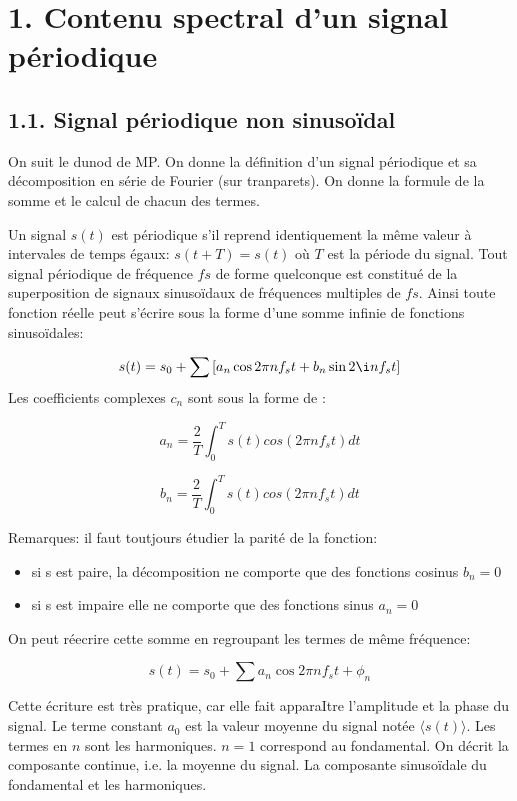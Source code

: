 \documentclass[french, a4paper, 10pt, twocolumn, landscape]{article}
\begin{document}
\section*{1. Contenu spectral d'un signal périodique}

\subsection*{1.1. Signal périodique non sinusoïdal}

On suit le dunod de MP. On donne la définition d'un signal périodique et sa décomposition en série de Fourier (sur tranparets). On donne la formule de la somme et le calcul de chacun des termes.\medskip

Un signal $s(t)$ est périodique s'il reprend identiquement la même valeur à intervales de temps égaux: $s(t+T)=s(t)$ où $T$ est la période du signal. Tout signal périodique de fréquence $fs$ de forme quelconque est constitué de la superposition de signaux sinusoïdaux de fréquences multiples de $fs$. Ainsi toute fonction réelle peut s'écrire sous la forme d'une somme infinie de fonctions sinusoïdales: 

\begin{equation}
  s(t)=s_0+\sum \left[a_n\cos{2\pi nf_st} + b_n\sin{2\i n f_st}\right]
\end{equation}
Les coefficients complexes $c_n$ sont sous la forme de :

$$  a_n = \dfrac{2}{T}\int_{0}^T{s(t)cos(2\pi nf_s t)dt}$$

$$  b_n = \dfrac{2}{T}\int_{0}^T{s(t)cos(2\pi nf_s t)dt}$$

Remarques: il faut toutjours étudier la parité de la fonction:
\begin{itemize}
  \item si s est paire, la décomposition ne comporte que des fonctions cosinus $b_n=0$
  \item si s est impaire elle ne comporte que des fonctions sinus $a_n =0$
\end{itemize}
On peut réecrire cette somme en regroupant les termes de même fréquence: 

\begin{equation}
  s(t)=s_0+\sum a_n\cos{2\pi nf_st+\phi_n}
\end{equation}

Cette écriture est très pratique, car elle fait apparaItre l'amplitude et la phase du signal. Le terme constant $a_0$ est la valeur moyenne du signal notée $\langle s(t) \rangle$. Les termes en $n$ sont les harmoniques. $n=1$ correspond au fondamental. On décrit la composante continue, i.e. la moyenne du signal. La composante sinusoïdale du fondamental et les harmoniques.
\end{document}

